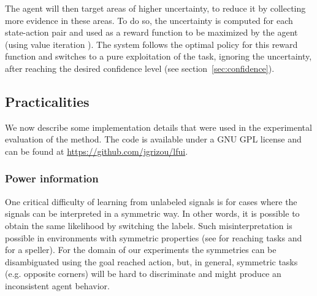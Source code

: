 
The agent will then target areas of higher uncertainty, to reduce it by collecting more evidence in these areas. To do so, the uncertainty is computed for each state-action pair and used as a reward function to be maximized by the agent (using value iteration \cite{barto1998reinforcement}).
The system follows the optimal policy for this reward function and switches to a pure exploitation of the task, ignoring the uncertainty, after reaching the desired confidence level (see section~\ref{sec:confidence}).

\subsection{Practicalities}
We now describe some implementation details that were used in the experimental evaluation of the method.  The code is available under a GNU GPL license and can be found at \url{https://github.com/jgrizou/lfui}.

\subsubsection{Power information}
One  critical difficulty of learning from unlabeled signals is for cases where the signals can be interpreted in a symmetric way. In other words, it is possible to obtain the same likelihood by switching the labels. Such misinterpretation is possible in environments with symmetric properties (see \cite{grizou2014interactive} for reaching tasks and \cite{Kindermans2012a,kindermans2014true} for a speller). For the domain of our experiments the symmetries can be disambiguated using the goal reached action, but, in general, symmetric tasks (e.g. opposite corners) will be hard to discriminate and might produce an inconsistent agent behavior.

